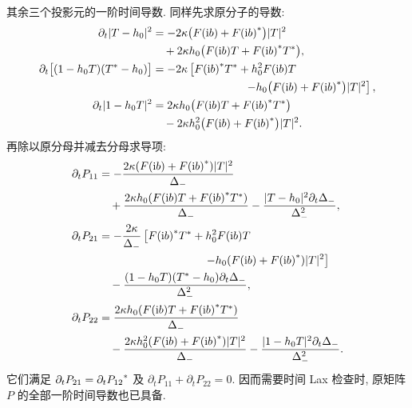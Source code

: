 \par\smallskip\noindent 其余三个投影元的一阶时间导数.\quad
同样先求原分子的导数:
\begin{align*}
\partial_t|T-h_0|^2
&=-2\kappa\bigl(F(\ii b)+\conj{F(\ii b)}\bigr)|T|^2\\
&\quad+2\kappa h_0
\bigl(F(\ii b)T+\conj{F(\ii b)}\conj{T}\bigr),\\
\partial_t\bigl[(1-h_0T)(\conj{T}-h_0)\bigr]
&=-2\kappa\left[
\conj{F(\ii b)}\conj{T}+h_0^2F(\ii b)T\right.\\
&\hspace{29mm}\left.
-h_0\bigl(F(\ii b)+\conj{F(\ii b)}\bigr)|T|^2\right],\\
\partial_t|1-h_0T|^2
&=2\kappa h_0
\bigl(F(\ii b)T+\conj{F(\ii b)}\conj{T}\bigr)\\
&\quad-2\kappa h_0^2
\bigl(F(\ii b)+\conj{F(\ii b)}\bigr)|T|^2.
\end{align*}
再除以原分母并减去分母求导项:
\begin{align*}
\partial_tP_{11}
&=-\dfrac{2\kappa(F(\ii b)+\conj{F(\ii b)})|T|^2}{\Delta_-}\\
&\quad+\dfrac{2\kappa h_0
(F(\ii b)T+\conj{F(\ii b)}\conj{T})}{\Delta_-}
-\dfrac{|T-h_0|^2\partial_t\Delta_-}{\Delta_-^2},\\
\partial_tP_{21}
&=-\dfrac{2\kappa}{\Delta_-}
\left[\conj{F(\ii b)}\conj{T}+h_0^2F(\ii b)T\right.\\
&\hspace{33mm}\left.
-h_0(F(\ii b)+\conj{F(\ii b)})|T|^2\right]\\
&\quad-\dfrac{(1-h_0T)(\conj{T}-h_0)
\partial_t\Delta_-}{\Delta_-^2},\\
\partial_tP_{22}
&=\dfrac{2\kappa h_0
(F(\ii b)T+\conj{F(\ii b)}\conj{T})}{\Delta_-}\\
&\quad-\dfrac{2\kappa h_0^2
(F(\ii b)+\conj{F(\ii b)})|T|^2}{\Delta_-}
-\dfrac{|1-h_0T|^2\partial_t\Delta_-}{\Delta_-^2}.
\end{align*}
它们满足 $\partial_tP_{21}={\partial_tP_{12}}^{*}$ 及 $\partial_tP_{11}+\partial_tP_{22}=0$. 因而需要时间 Lax 检查时, 原矩阵 $P$ 的全部一阶时间导数也已具备.

